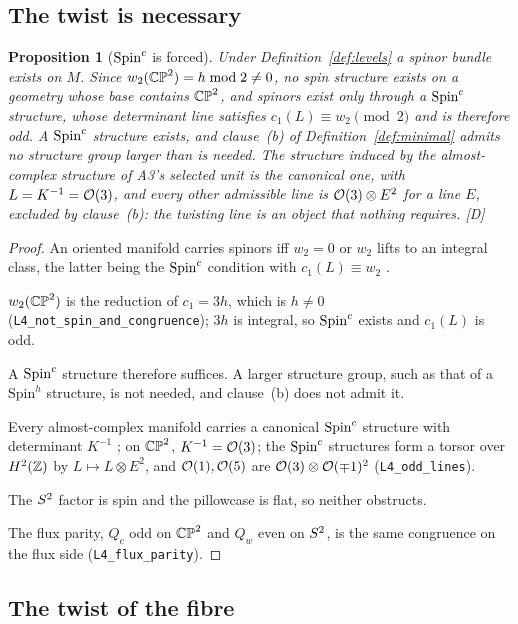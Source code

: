 \documentclass[11pt,a4paper]{article}
\theoremstyle{plain}
\newtheorem{proposition}[theorem]{Proposition}
\theoremstyle{definition}
\theoremstyle{remark}
\newcommand{\rigD}{[\textup{D}]}
\begin{document}
\subsection{The twist is necessary}

\begin{proposition}[$\text{Spin}^c$ is forced]\label{prop:spinc}
Under Definition~\ref{def:levels} a spinor bundle exists on $M$. Since $w_{2}(\mathbb{CP}^2)=h\bmod2\neq0$, no spin structure exists on a geometry whose base contains $\mathbb{CP}^2$, and spinors exist only through a $\text{Spin}^c$ structure, whose determinant line satisfies $c_{1}(L)\equiv w_{2}\pmod2$ and is therefore odd. A $\text{Spin}^c$ structure exists, and clause~(b) of Definition~\ref{def:minimal} admits no structure group larger than is needed. The structure induced by the almost-complex structure of A3's selected unit is the canonical one, with $L=K^{-1}=\mathcal{O}(3)$, and every other admissible line is $\mathcal{O}(3)\otimes E^{2}$ for a line $E$, excluded by clause~(b): the twisting line is an object that nothing requires. \rigD
\end{proposition}

\begin{proof}
An oriented manifold carries spinors iff $w_{2}=0$ or $w_{2}$ lifts to an integral class, the latter being the $\text{Spin}^c$ condition with $c_{1}(L)\equiv w_{2}$ \cite{LawsonMichelsohn}.

$w_{2}(\mathbb{CP}^2)$ is the reduction of $c_{1}=3h$, which is $h\neq0$ (\texttt{L4\_not\_spin\_and\_congruence}); $3h$ is integral, so $\text{Spin}^c$ exists and $c_{1}(L)$ is odd.

A $\text{Spin}^c$ structure therefore suffices. A larger structure group, such as that of a $\mathrm{Spin}^{h}$ structure, is not needed, and clause~(b) does not admit it.

Every almost-complex manifold carries a canonical $\text{Spin}^c$ structure with determinant $K^{-1}$ \cite{LawsonMichelsohn,Friedrich}; on $\mathbb{CP}^2$, $K^{-1}=\mathcal{O}(3)$; the $\text{Spin}^c$ structures form a torsor over $H^{2}(\mathbb{Z})$ by $L\mapsto L\otimes E^{2}$, and $\mathcal{O}(1),\mathcal{O}(5)$ are $\mathcal{O}(3)\otimes\mathcal{O}(\mp1)^{2}$ (\texttt{L4\_odd\_lines}).

The $S^2$ factor is spin and the pillowcase is flat, so neither obstructs.

The flux parity, $Q_{c}$ odd on $\mathbb{CP}^2$ and $Q_{w}$ even on $S^2$, is the same congruence on the flux side (\texttt{L4\_flux\_parity}).
\end{proof}

\subsection{The twist of the fibre}\label{sec:twist}
\end{document}
